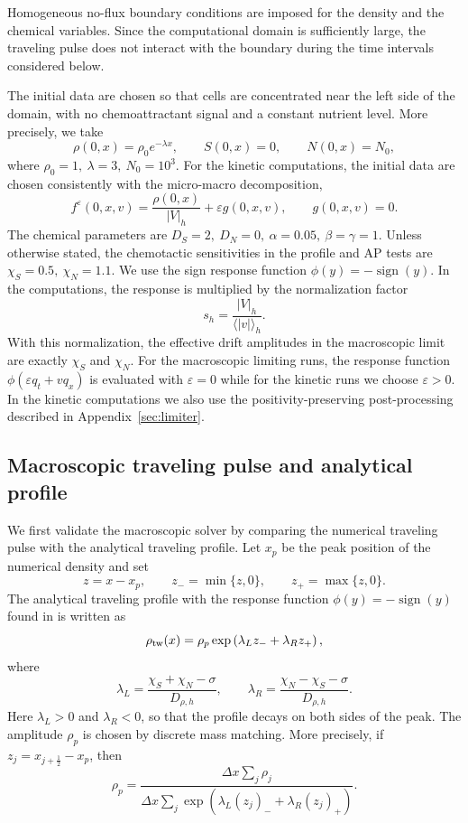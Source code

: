 \documentclass[11pt,twoside]{article}
\numberwithin{equation}{section}
\theoremstyle{plain}
\theoremstyle{nonumberplain}
\begin{document}
{{Homogeneous no-flux boundary conditions are imposed for the density and
the chemical variables. Since the computational domain is sufficiently
large, the traveling pulse does not interact with the boundary during
the time intervals considered below.

The initial data are chosen so that cells are concentrated near the left
side of the domain, with no chemoattractant signal and a constant
nutrient level. More precisely, we take
\[
\rho(0,x)=\rho_0 e^{-\lambda x},
\qquad
S(0,x)=0,
\qquad
N(0,x)=N_0,
\]
where
$\rho_0=1,
\
\lambda=3,
\
N_0=10^3 .$
For the kinetic computations, the initial data are chosen consistently
with the micro-macro decomposition,
\[
f^\varepsilon(0,x,v)
=
\frac{\rho(0,x)}{|V|_h}
+
\varepsilon g(0,x,v),
\qquad
g(0,x,v)=0 .
\]
The chemical parameters are
$
D_S=2,
\
D_N=0,
\
\alpha=0.05,
\
\beta=\gamma=1 .
$
Unless otherwise stated, the chemotactic sensitivities in the profile
and AP tests are
$\chi_S=0.5,
\
\chi_N=1.1 .$
We use the sign response function
$
\phi(y)=-\operatorname{sign}(y).$
In the computations, the response is multiplied by the normalization
factor
\[
s_h=\frac{|V|_h}{\langle |v|\rangle_h}.
\]
With this normalization, the effective drift amplitudes in the
macroscopic limit are exactly \(\chi_S\) and \(\chi_N\). For the
macroscopic limiting runs, the response function \(\phi(\varepsilon q_t+vq_x)\) is evaluated with $\varepsilon=0$ while for the kinetic runs we choose \(\varepsilon>0\). In the kinetic computations we also use
the positivity-preserving post-processing described in Appendix~\ref{sec:limiter}.

\subsection{Macroscopic traveling pulse and analytical profile}

We first validate the macroscopic solver by comparing the numerical
traveling pulse with the analytical traveling profile. Let
\(x_p\) be the peak position of the numerical density and set
\[
z=x-x_p,
\qquad
z_-=\min\{z,0\},
\qquad
z_+=\max\{z,0\}.
\]
The analytical traveling profile with the response function $\phi(y)=-\operatorname{sign}(y)$ found in \cite{calvez2019chemotactic} is written as 
\begin{equation}
\rho_{\rm tw}(x)
=
\rho_p
\exp\left(
\lambda_L z_-
+
\lambda_R z_+
\right),
\label{eq:analytic-sol}
\end{equation}
where
\[
\lambda_L
=
\frac{\chi_S+\chi_N-\sigma}{D_{\rho,h}},
\qquad
\lambda_R
=
\frac{\chi_N-\chi_S-\sigma}{D_{\rho,h}} .
\]
Here \(\lambda_L>0\) and \(\lambda_R<0\), so that the profile decays on
both sides of the peak. The amplitude \(\rho_p\) is chosen by discrete
mass matching. More precisely, if \(z_j=x_{j+\frac12}-x_p\), then
\[
\rho_p
=
\frac{
\Delta x\sum_j \rho_j
}{
\Delta x\sum_j
\exp\left(
\lambda_L (z_j)_-
+
\lambda_R (z_j)_+
\right)
}.
\]

}}
\end{document}
